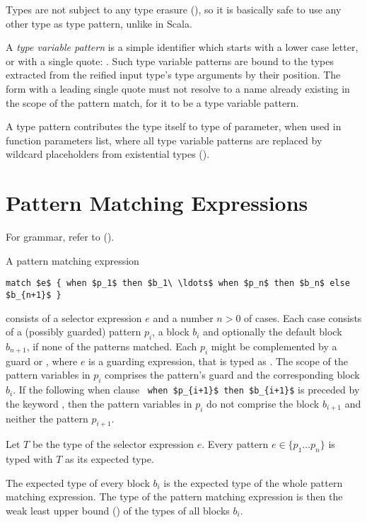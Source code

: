Types are not subject to any type erasure (), so it is basically safe to use any other type as type pattern, unlike in Scala. 

A {\em type variable pattern} is a simple identifier which starts with a lower case letter, or with a single quote: . Such type variable patterns are bound to the types extracted from the reified input type's type arguments by their position. The form with a leading single quote must not resolve to a name already existing in the scope of the pattern match, for it to be a type variable pattern. 

A type pattern contributes the type itself to type of parameter, when used in function parameters list, where all type variable patterns are replaced by wildcard placeholders from existential types ().





\section{Pattern Matching Expressions}

For grammar, refer to ().

A pattern matching expression 
\begin{lstlisting}
match $e$ { when $p_1$ then $b_1\ \ldots$ when $p_n$ then $b_n$ else $b_{n+1}$ }
\end{lstlisting}
consists of a selector expression $e$ and a number $n > 0$ of cases. Each case consists of a (possibly guarded) pattern $p_i$, a block $b_i$ and optionally the default block $b_{n+1}$, if none of the patterns matched. Each $p_i$ might be complemented by a guard  or , where $e$ is a guarding expression, that is typed as . The scope of the pattern variables in $p_i$ comprises the pattern's guard and the corresponding block $b_i$. If the following when clause ~\lstinline!when $p_{i+1}$ then $b_{i+1}$! is preceded by the keyword , then the pattern variables in $p_i$ do not comprise the block $b_{i+1}$ and neither the pattern $p_{i+1}$. 

Let $T$ be the type of the selector expression $e$. Every pattern $e \in \{ p_1 \ldots p_n \}$ is typed with $T$ as its expected type. 

The expected type of every block $b_i$ is the expected type of the whole pattern matching expression. The type of the pattern matching expression is then the weak least upper bound () of the types of all blocks $b_i$. 

